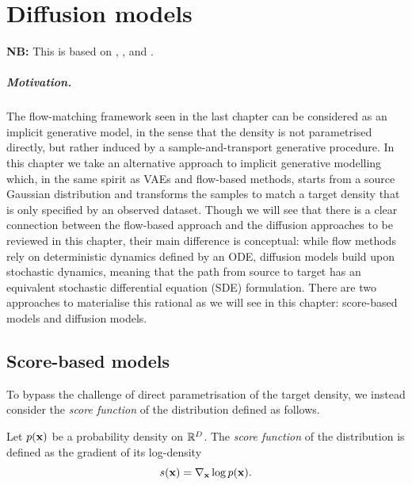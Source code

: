 \chapter{Diffusion models}

\textbf{NB:} This is based on \cite{sohldickstein2015deep}, \cite{ho2020denoising}, \cite{song2019generative} and \cite{song2021scorebased}.


\paragraph{Motivation.}

The flow-matching framework seen in the last chapter can be considered as an implicit generative model, in the sense that the density is not parametrised directly, but rather induced by a sample-and-transport generative procedure. In this chapter we take an alternative approach to implicit generative modelling which, in the same spirit as VAEs and flow-based methods, starts from a source Gaussian distribution and transforms the samples to match a target density that is only specified by an observed dataset. Though we will see that there is a clear connection between the flow-based approach and the diffusion approaches to be reviewed in this chapter, their main difference is conceptual: while flow methods rely on deterministic dynamics defined by an ODE, diffusion models build upon stochastic dynamics, meaning that the path from source to target has an equivalent stochastic differential equation (SDE) formulation. There are two approaches to materialise this rational as we will see in this chapter: score-based models and diffusion models.

\section{Score-based models}

To bypass the challenge of direct parametrisation of the target density, we instead consider the \emph{score function} of the distribution defined as follows.

\begin{definition}
\label{def:score_function}
Let $p({ \mathbf{x}})$ be a probability density on ${\mathbb R}^D$. The \emph{score function} of the distribution is defined as the gradient of its log-density
\begin{equation}
    \label{eq:score_function}
    s({ \mathbf{x}}) = \nabla_{ \mathbf{x}} \log p({ \mathbf{x}}).
\end{equation}
\end{definition}

